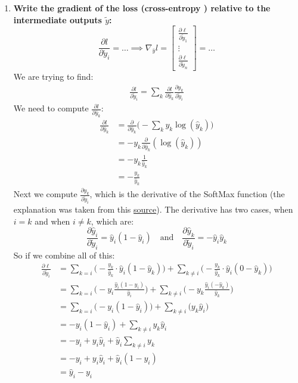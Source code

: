 \documentclass[12pt,a4paper]{article}
\begin{document}
\begin{enumerate}[resume]
    \item \textbf{Write the gradient of the loss (cross-entropy ) relative to the intermediate outputs $\tilde{y}$:
    $$ \frac{\partial l}{\partial \tilde{y}_i} = \dots \implies \nabla_{\bar{y}} l =  
    \begin{bmatrix}
    \frac{\partial \ell}{\partial \tilde{y}_1} \\
    \vdots \\
    \frac{\partial \ell}{\partial \tilde{y}_n}
    \end{bmatrix}
    = \dots$$} \newline
    We are trying to find:
    \begin{align*}
        \frac{\partial l}{\partial \tilde{y}_i} = \sum_{k} \frac{\partial l}{\partial \hat{y}_k}  \frac{\partial \hat{y}_k}{\partial \tilde{y}_i}
    \end{align*}
    We need to compute $ \frac{\partial l}{\partial \hat{y}_k} $:
    \begin{align*}
        \frac{\partial l}{\partial \hat{y}_k} &= \frac{\partial}{\partial \hat{y}_k} \Big(- \sum_{k} y_k \log(\hat{y}_k)\Big) \\
        &= - y_k \frac{\partial}{\partial \hat{y}_k} (\log(\hat{y}_k)) \\
        &= - y_k \frac{1}{\hat{y}_k} \\
        &= - \frac{y_k}{\hat{y}_k}
    \end{align*}
    Next we compute $ \frac{\partial \hat{y}_k}{\partial \tilde{y}_i} $, which is the derivative of the SoftMax function
    (the explanation was taken from this \href{https://eli.thegreenplace.net/2016/the-softmax-function-and-its-derivative/}{source}).
    The derivative has two cases, when $i = k$ and when $i \neq k$, which are:
    \[
        \frac{\partial \hat{y}_i}{\partial \tilde{y}_i} = \hat{y}_i (1 - \hat{y}_i) \quad \text{and} \quad
        \frac{\partial \hat{y}_k}{\partial \tilde{y}_i} = - \hat{y}_i \hat{y}_k 
    \]
    So if we combine all of this:
    \begin{align*}
        \frac{\partial \ell}{\partial \tilde{y}_i} 
        &= \sum_{k=i} \Big(- \frac{y_k}{\hat{y}_k} \cdot \hat{y}_i (1 - \hat{y}_k) \Big)
        + \sum_{k \neq i} \Big(- \frac{y_k}{\hat{y}_k} \cdot \hat{y}_i (0 - \hat{y}_k) \Big) \\
        &= \sum_{k=i} \Big(- y_i \frac{\hat{y}_i (1 - \hat{y}_i)}{\hat{y}_i} \Big)
        + \sum_{k \neq i} \Big(- y_k \frac{\hat{y}_i (- \hat{y}_k)}{\hat{y}_k} \Big) \tag{1}\\
        &= \sum_{k=i} \Big(- y_i (1 - \hat{y}_i) \Big)
        + \sum_{k \neq i} \Big(y_k \hat{y}_i \Big) \\
        &= -y_i (1 - \hat{y}_i) + \sum_{k \neq i} y_k \hat{y}_i \\
        &= -y_i + y_i \hat{y}_i + \hat{y}_i \sum_{k \neq i} y_k \\
        &= -y_i + y_i \hat{y}_i + \hat{y}_i (1 - y_i) \\[1mm]
        &= \hat{y}_i - y_i
    \end{align*}


\end{enumerate}
\end{document}
